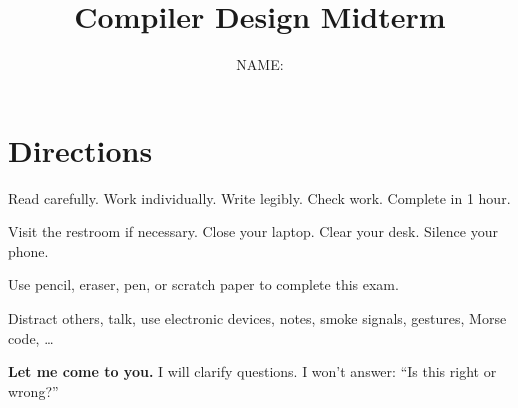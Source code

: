 \documentclass[addpoints]{exam}
\title{Compiler Design Midterm}
\author{NAME: \underline{\hspace{10cm}}}
\date{}
\begin{document}
\maketitle

\section*{Directions}
Read carefully. Work individually. Write legibly. Check work. Complete in 1 hour.
\begin{description}[leftmargin=!,labelwidth=\widthof{\bfseries Beforehand}]
\item[Beforehand] Visit the restroom if necessary. Close your laptop. Clear your desk. Silence your phone.
\item[DO] Use pencil, eraser, pen, or scratch paper to complete this exam.
\item[DO NOT] Distract others, talk, use electronic devices, notes, smoke signals, gestures, Morse code, \ldots
\item[Confused?] \textbf{Let me come to you.} I will clarify questions. I won't answer: ``Is this right or wrong?''
\end{description}
\end{document}
